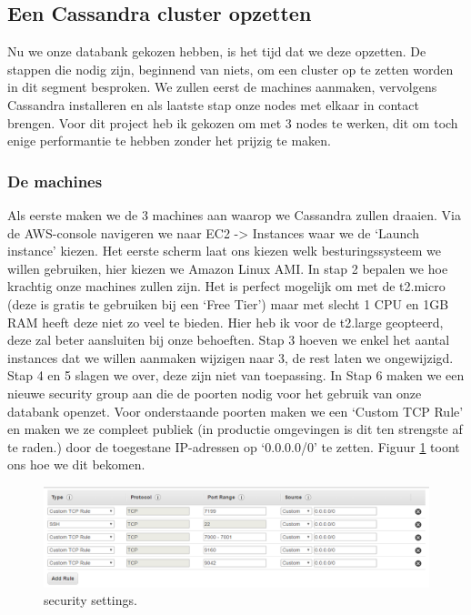 \documentclass{article}
\begin{document}
	\subsection{Een Cassandra cluster opzetten}
	Nu we onze databank gekozen hebben, is het tijd dat we deze opzetten. 
	De stappen die nodig zijn, beginnend van niets, om een cluster op te zetten worden in dit segment besproken. 
	We zullen eerst de machines aanmaken, vervolgens Cassandra installeren en als laatste stap onze nodes met elkaar in contact brengen.
	Voor dit project heb ik gekozen om met 3 nodes te werken, dit om toch enige performantie te hebben zonder het prijzig te maken.
	\subsubsection{De machines}
	Als eerste maken we de 3 machines aan waarop we Cassandra zullen draaien. 
	Via de AWS-console navigeren we naar EC2 -> Instances waar we de ‘Launch instance’ kiezen.
	Het eerste scherm laat ons kiezen welk besturingssysteem we willen gebruiken, hier kiezen we Amazon Linux AMI. 
	In stap 2 bepalen we hoe krachtig onze machines zullen zijn. Het is perfect mogelijk om met de t2.micro 
	(deze is gratis te gebruiken bij een ‘Free Tier’) maar met slecht 1 CPU en 1GB RAM heeft deze niet zo veel te bieden. 
	Hier heb ik voor de t2.large geopteerd, deze zal beter aansluiten bij onze behoeften. 
	Stap 3 hoeven we enkel het aantal instances dat we willen aanmaken wijzigen naar 3, 
	de rest laten we ongewijzigd. Stap 4 en 5 slagen we over, deze zijn niet van toepassing. 
	In Stap 6 maken we een nieuwe security group aan die de poorten nodig voor het gebruik van onze databank openzet. 
	Voor onderstaande poorten maken we een ‘Custom TCP Rule’ en maken we ze compleet publiek (in productie omgevingen is 
	dit ten strengste af te raden.) door de toegestane IP-adressen op ‘0.0.0.0/0’ te zetten. 	Figuur \ref{fig:security-settings} toont ons hoe we dit bekomen.
	
	
	
	\begin{figure}[h!]
  		\includegraphics[width=\linewidth]{images/inbound-rules-cassandra.PNG}
  		\caption{security settings.}
  		\label{fig:security-settings}
	\end{figure}
	
\end{document}
